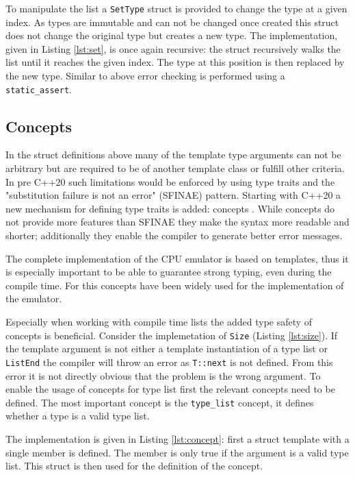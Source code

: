 To manipulate the list a \lstinline{SetType} struct is provided to change the type at 
a given index. As types are immutable and can not be changed once created this struct
does not change the original type but creates a new type. The implementation, given
in Listing \ref{lst:set}, is once again recursive: 
the struct recursively walks the list until it reaches the given index. The
type at this position is then replaced by the new type. Similar to above error
checking is performed using a \lstinline{static_assert}.



\subsection{Concepts}
In the struct definitions above many of the template type arguments can not be arbitrary
but are required to be of another template class or fulfill other criteria. In pre C++20
such limitations would be enforced by using type traits and the "substitution failure is 
not an error" (SFINAE) pattern.
Starting with C++20 a new mechanism for defining type traits is added: concepts \cite{concepts}.
While concepts do not provide more features than SFINAE they make the syntax more readable and shorter; 
additionally they enable the compiler to generate better error messages.

The complete implementation of the CPU emulator is based on templates, thus it is especially important to be able to guarantee strong typing, even during the compile time. For this
concepts have been widely used for the implementation of the emulator.

Especially when working with compile time lists the added type safety of concepts is
beneficial. Consider the implemetation of \lstinline{Size} (Listing \ref{lst:size}).
If the template argument is not either a template instantiation of a type list or 
\lstinline{ListEnd} the compiler will throw an error as \lstinline{T::next} is not
defined. From this error it is not directly obvious that the problem is the wrong
argument. To enable the usage of concepts for type list first the relevant concepts
need to be defined. The most important concept is the \lstinline{type_list} concept,
it defines whether a type is a valid type list.

The implementation is given in Listing \ref{lst:concept}: first a struct template with
a single member is defined. The member is only true if the argument is a valid type list.
This struct is then used for the definition of the concept.

